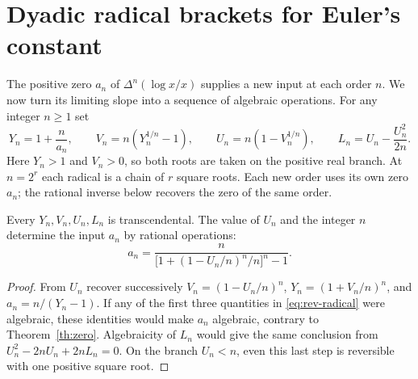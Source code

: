 \documentclass[11pt,a4paper]{article}
\theoremstyle{definition}\newtheorem{definition}[theorem]{Definition}\newtheorem{example}[theorem]{Example}
\theoremstyle{remark}\newtheorem{remark}[theorem]{Remark}
\begin{document}
\section{Dyadic radical brackets for Euler's constant}\label{sec:rev-brackets}

The positive zero $a_n$ of $\Delta^n(\log x/x)$ supplies a new input at each order $n$. We now turn its limiting slope into a sequence of algebraic operations. For any integer $n\ge1$ set
\begin{equation}\label{eq:rev-radical}
 Y_n=1+\frac{n}{a_n},\qquad
 V_n=n(Y_n^{1/n}-1),\qquad
 U_n=n(1-V_n^{1/n}),\qquad L_n=U_n-\frac{U_n^2}{2n}.
\end{equation}
Here $Y_n>1$ and $V_n>0$, so both roots are taken on the positive real branch. At $n=2^r$ each radical is a chain of $r$ square roots. Each new order uses its own zero $a_n$; the rational inverse below recovers the zero of the same order.

\begin{proposition}\label{prop:rev-recovery}
Every $Y_n,V_n,U_n,L_n$ is transcendental. The value of $U_n$ and the integer $n$ determine the input $a_n$ by rational operations:
\[
 a_n=\frac{n}{\bigl[1+(1-U_n/n)^n/n\bigr]^n-1}.
\]
\end{proposition}
\begin{proof}
From $U_n$ recover successively $V_n=(1-U_n/n)^n$, $Y_n=(1+V_n/n)^n$, and $a_n=n/(Y_n-1)$. If any of the first three quantities in \eqref{eq:rev-radical} were algebraic, these identities would make $a_n$ algebraic, contrary to Theorem~\ref{th:zero}. Algebraicity of $L_n$ would give the same conclusion from $U_n^2-2nU_n+2nL_n=0$. On the branch $U_n<n$, even this last step is reversible with one positive square root.
\end{proof}
\end{document}

